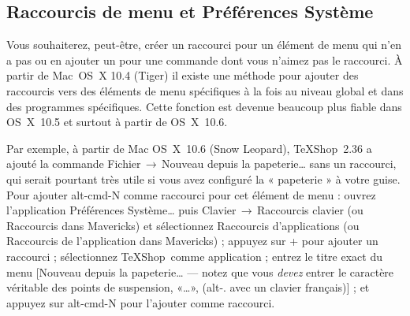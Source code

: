 \documentclass[11pt,french]{article}
\newcommand{\TS}{\textsf{\TeX Shop}}
\newcommand{\cmd}[1]{\textsf{#1}}
\newcommand{\mnu}[1]{\textsf{#1}}
\newcommand{\To}{\,\(\to\)\,}
\begin{document}

\subsection{Raccourcis de menu et Préférences Système}

Vous souhaiterez, peut-être, créer un raccourci pour un élément de menu qui n'en a pas ou en ajouter un pour une commande dont vous n'aimez pas le raccourci. À partir de Mac~OS~X 10.4 (Tiger) il existe une méthode pour ajouter des raccourcis vers des éléments de menu spécifiques à la fois au niveau global et dans des programmes spécifiques. Cette fonction est devenue beaucoup plus fiable dans OS~X~10.5 et surtout à partir de OS~X~10.6.


Par exemple, à partir de Mac OS~X~10.6 (Snow Leopard), \TS\ 2.36 a ajouté la commande \mnu{Fichier}\To\mnu{Nouveau depuis la papeterie…} sans un raccourci, qui serait pourtant très utile si vous avez configuré la « papeterie » à votre guise. Pour ajouter \cmd{alt-cmd-N} comme raccourci pour cet élément de menu : ouvrez l'application \textsf{Préférences Système…} puis \mnu{Clavier}\To\mnu{Raccourcis clavier} (ou \mnu{Raccourcis} dans \cmd{Mavericks}) et sélectionnez \mnu{Raccourcis d'applications} (ou \mnu{Raccourcis de l'application} dans \cmd{Mavericks}) ; appuyez sur \mnu{+} pour ajouter un raccourci ; sélectionnez \TS\ comme application ; entrez le titre exact du menu [\mnu{Nouveau depuis la papeterie…} --- notez que vous \emph{devez} entrer le caractère véritable des points de suspension, «…», (\cmd{alt-.} avec un clavier français)] ; et appuyez sur \cmd{alt-cmd-N} pour l'ajouter comme raccourci.
\end{document}
